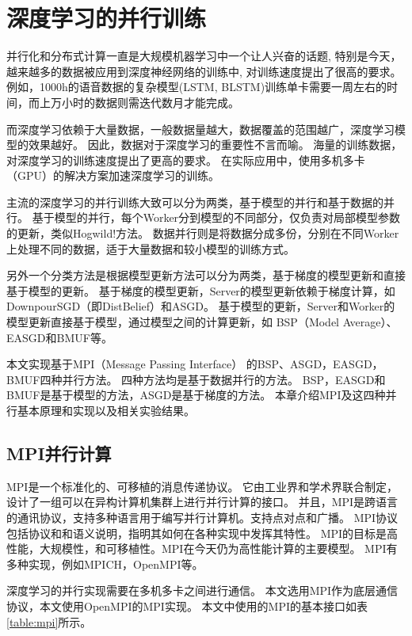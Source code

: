 ﻿%
\chapter{深度学习的并行训练}

并行化和分布式计算一直是大规模机器学习中一个让人兴奋的话题, 特别是今天，越来越多的数据被应用到深度神经网络的训练中, 对训练速度提出了很高的要求。
例如，1000h的语音数据的复杂模型(LSTM, BLSTM)训练单卡需要一周左右的时间，而上万小时的数据则需迭代数月才能完成。

而深度学习依赖于大量数据，一般数据量越大，数据覆盖的范围越广，深度学习模型的效果越好。
因此，数据对于深度学习的重要性不言而喻。
海量的训练数据，对深度学习的训练速度提出了更高的要求。
在实际应用中，使用多机多卡（GPU）的解决方案加速深度学习的训练。

主流的深度学习的并行训练大致可以分为两类，基于模型的并行和基于数据的并行。
基于模型的并行，每个Worker分到模型的不同部分，仅负责对局部模型参数的更新，类似Hogwild!方法。
数据并行则是将数据分成多份，分别在不同Worker上处理不同的数据，适于大量数据和较小模型的训练方式。

另外一个分类方法是根据模型更新方法可以分为两类，基于梯度的模型更新和直接基于模型的更新。
基于梯度的模型更新，Server的模型更新依赖于梯度计算，如DownpourSGD（即DistBelief）和ASGD。
基于模型的更新，Server和Worker的模型更新直接基于模型，通过模型之间的计算更新，如 BSP（Model Average）、EASGD和BMUF等。

本文实现基于MPI（Message Passing Interface） 的BSP、ASGD，EASGD，BMUF四种并行方法。
四种方法均是基于数据并行的方法。
BSP，EASGD和BMUF是基于模型的方法，ASGD是基于梯度的方法。
本章介绍MPI及这四种并行基本原理和实现以及相关实验结果。

\section{MPI并行计算}

MPI是一个标准化的、可移植的消息传递协议。
它由工业界和学术界联合制定，设计了一组可以在异构计算机集群上进行并行计算的接口。
并且，MPI是跨语言的通讯协议，支持多种语言用于编写并行计算机。支持点对点和广播。
MPI协议包括协议和和语义说明，指明其如何在各种实现中发挥其特性。
MPI的目标是高性能，大规模性，和可移植性。MPI在今天仍为高性能计算的主要模型。
MPI有多种实现，例如MPICH，OpenMPI等。

深度学习的并行实现需要在多机多卡之间进行通信。
本文选用MPI作为底层通信协议，本文使用OpenMPI的MPI实现。
本文中使用的MPI的基本接口如表\ref{table:mpi}所示。

